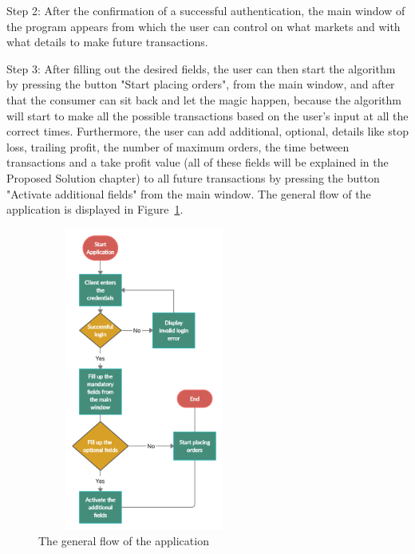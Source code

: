 \documentclass[12pt,a4paper]{report}
\begin{document}
Step 2:
After the confirmation of a successful authentication, the main window of the program appears from which the user can control on what markets and with what details to make future transactions.

Step 3:
After filling out the desired fields, the user can then start the algorithm by pressing the button "Start placing orders", from the main window, and after that the consumer can sit back and let the magic happen, because the algorithm will start to make all the possible transactions based on the user's input at all the correct times. Furthermore, the user can add additional, optional, details like stop loss, trailing profit, the number of maximum orders, the time between transactions and a take profit value (all of these fields will be explained in the Proposed Solution chapter) to all future transactions by pressing the button "Activate additional fields" from the main window. The general flow of the application is displayed in Figure~\ref{fig:appflow}.
\begin{figure}[!ht]
	\centering
	\includegraphics[width=7cm,height=10cm]{pics/appflow.png}
	\caption{The general flow of the application}
	\label{fig:appflow}
\end{figure}
\end{document}
